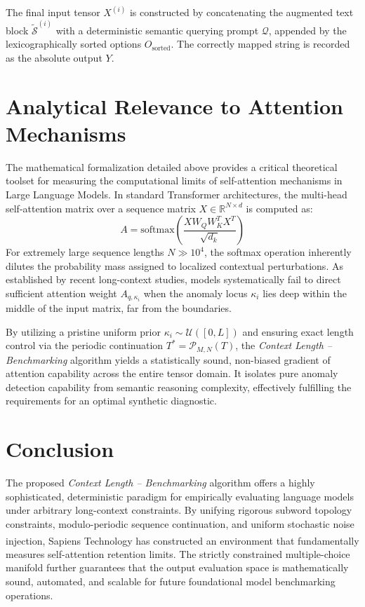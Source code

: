 \documentclass[11pt,a4paper]{article}
\newcommand{\R}{\mathbb{R}}
\newcommand{\U}{\mathcal{U}}
\begin{document}
The final input tensor $X^{(i)}$ is constructed by concatenating the augmented text block $\tilde{\mathcal{S}}^{(i)}$ with a deterministic semantic querying prompt $\mathcal{Q}$, appended by the lexicographically sorted options $O_{\text{sorted}}$. The correctly mapped string is recorded as the absolute output $Y$.

\section{Analytical Relevance to Attention Mechanisms}
The mathematical formalization detailed above provides a critical theoretical toolset for measuring the computational limits of self-attention mechanisms in Large Language Models. In standard Transformer architectures, the multi-head self-attention matrix over a sequence matrix $X \in \R^{N \times d}$ is computed as:
\begin{equation}
A = \text{softmax}\left( \frac{X W_Q W_K^T X^T}{\sqrt{d_k}} \right)
\end{equation}
For extremely large sequence lengths $N \gg 10^4$, the softmax operation inherently dilutes the probability mass assigned to localized contextual perturbations. As established by recent long-context studies, models systematically fail to direct sufficient attention weight $A_{q, \kappa_i}$ when the anomaly locus $\kappa_i$ lies deep within the middle of the input matrix, far from the boundaries. 

By utilizing a pristine uniform prior $\kappa_i \sim \U([0, L])$ and ensuring exact length control via the periodic continuation $T^* = \mathcal{P}_{M,N}(T)$, the \textit{Context Length -- Benchmarking} algorithm yields a statistically sound, non-biased gradient of attention capability across the entire tensor domain. It isolates pure anomaly detection capability from semantic reasoning complexity, effectively fulfilling the requirements for an optimal synthetic diagnostic.

\section{Conclusion}
The proposed \textit{Context Length -- Benchmarking} algorithm offers a highly sophisticated, deterministic paradigm for empirically evaluating language models under arbitrary long-context constraints. By unifying rigorous subword topology constraints, modulo-periodic sequence continuation, and uniform stochastic noise injection, Sapiens Technology\textsuperscript{\tiny\textregistered} has constructed an environment that fundamentally measures self-attention retention limits. The strictly constrained multiple-choice manifold further guarantees that the output evaluation space is mathematically sound, automated, and scalable for future foundational model benchmarking operations.
\end{document}
